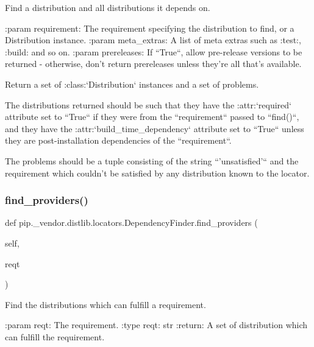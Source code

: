 \begin{DoxyVerb}Find a distribution and all distributions it depends on.

:param requirement: The requirement specifying the distribution to
            find, or a Distribution instance.
:param meta_extras: A list of meta extras such as :test:, :build: and
            so on.
:param prereleases: If ``True``, allow pre-release versions to be
            returned - otherwise, don't return prereleases
            unless they're all that's available.

Return a set of :class:`Distribution` instances and a set of
problems.

The distributions returned should be such that they have the
:attr:`required` attribute set to ``True`` if they were
from the ``requirement`` passed to ``find()``, and they have the
:attr:`build_time_dependency` attribute set to ``True`` unless they
are post-installation dependencies of the ``requirement``.

The problems should be a tuple consisting of the string
``'unsatisfied'`` and the requirement which couldn't be satisfied
by any distribution known to the locator.
\end{DoxyVerb}
 \mbox{\label{classpip_1_1__vendor_1_1distlib_1_1locators_1_1DependencyFinder_ac3932b4a3b8d90ee83ae21a847619727}} 
\subsubsection{\texorpdfstring{find\+\_\+providers()}{find\_providers()}}
{\footnotesize\ttfamily def pip.\+\_\+vendor.\+distlib.\+locators.\+Dependency\+Finder.\+find\+\_\+providers (\begin{DoxyParamCaption}\item[{}]{self,  }\item[{}]{reqt }\end{DoxyParamCaption})}

\begin{DoxyVerb}Find the distributions which can fulfill a requirement.

:param reqt: The requirement.
 :type reqt: str
:return: A set of distribution which can fulfill the requirement.
\end{DoxyVerb}
 \mbox{\label{classpip_1_1__vendor_1_1distlib_1_1locators_1_1DependencyFinder_abc4b69b38d73d3501a3cf44eadf39528}} 
